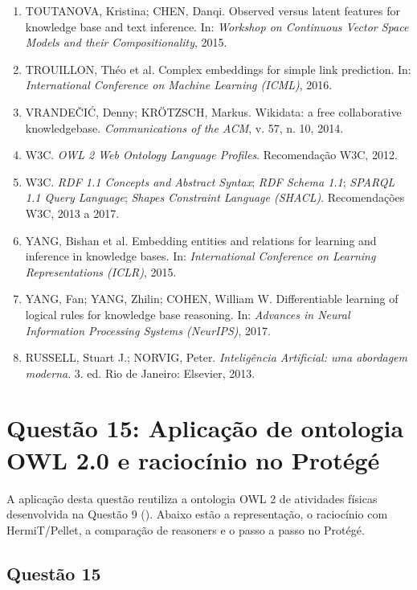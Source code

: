 \documentclass[12pt, a4paper]{article}
\DeclareRobustCommand{\texttt}[1]{\breakabletexttt{#1}}
\begin{document}
\begin{enumerate}
\item
  TOUTANOVA, Kristina; CHEN, Danqi. Observed versus latent features for knowledge base and text inference. In: \emph{Workshop on Continuous Vector Space Models and their Compositionality}, 2015.
\item
  TROUILLON, Théo et al. Complex embeddings for simple link prediction. In: \emph{International Conference on Machine Learning (ICML)}, 2016.
\item
  VRANDEČIĆ, Denny; KRÖTZSCH, Markus. Wikidata: a free collaborative knowledgebase. \emph{Communications of the ACM}, v. 57, n. 10, 2014.
\item
  W3C. \emph{OWL 2 Web Ontology Language Profiles}. Recomendação W3C, 2012.
\item
  W3C. \emph{RDF 1.1 Concepts and Abstract Syntax}; \emph{RDF Schema 1.1}; \emph{SPARQL 1.1 Query Language}; \emph{Shapes Constraint Language (SHACL)}. Recomendações W3C, 2013 a 2017.
\item
  YANG, Bishan et al. Embedding entities and relations for learning and inference in knowledge bases. In: \emph{International Conference on Learning Representations (ICLR)}, 2015.
\item
  YANG, Fan; YANG, Zhilin; COHEN, William W. Differentiable learning of logical rules for knowledge base reasoning. In: \emph{Advances in Neural Information Processing Systems (NeurIPS)}, 2017.
\item
  RUSSELL, Stuart J.; NORVIG, Peter. \emph{Inteligência Artificial: uma abordagem moderna}. 3. ed. Rio de Janeiro: Elsevier, 2013.
\end{enumerate}

\section{Questão 15: Aplicação de ontologia OWL 2.0 e raciocínio no Protégé}
\label{sec:q15}

A aplicação desta questão reutiliza a ontologia OWL 2 de atividades físicas desenvolvida na Questão 9 (\texttt{src/q09\_q15\_ontologia/}). Abaixo estão a representação, o raciocínio com HermiT/Pellet, a comparação de reasoners e o passo a passo no Protégé.

\subsection{Questão 15}\label{questuxe3o-15}
\end{document}

